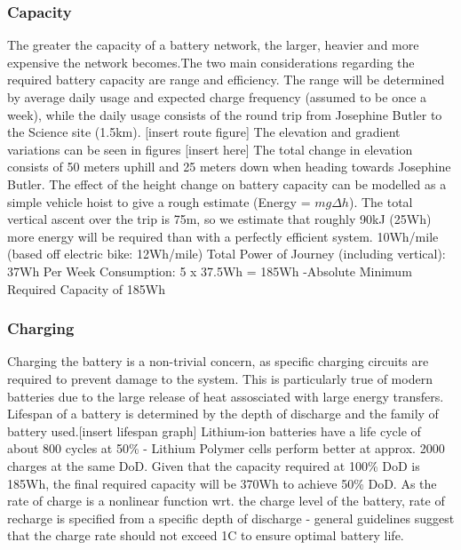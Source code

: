 \documentclass[journal,10pt]{IEEEtran}
\begin{document}
        \subsubsection{Capacity}
        The greater the capacity of a battery network, the larger, heavier and more expensive the network becomes.The two main considerations regarding the required battery capacity are range and efficiency. The range will be determined by average daily usage and expected charge frequency (assumed to be once a week), while the daily usage consists of the round trip from Josephine Butler to the Science site (1.5km). [insert route figure]
        The elevation and gradient variations can be seen in figures [insert here]
        The total change in elevation consists of 50 meters uphill and 25 meters down when heading towards Josephine Butler. The effect of the height change on battery capacity can be modelled as a simple vehicle hoist to give a rough estimate (Energy = $mg\Delta h$). The total vertical ascent over the trip is 75m, so we estimate that roughly 90kJ (25Wh) more energy will be required than with a perfectly efficient system.
            10Wh/mile (based off electric bike: 12Wh/mile)
            Total Power of Journey (including vertical): 37Wh
            Per Week Consumption: 5 x 37.5Wh = 185Wh
            -Absolute Minimum Required Capacity of 185Wh
        \subsubsection{Charging}
            Charging the battery is a non-trivial concern, as specific charging circuits are required to prevent damage to the system. This is particularly true of modern batteries due to the large release of heat assosciated with large energy transfers.
            Lifespan of a battery is determined by the depth of discharge and the family of battery used.[insert lifespan graph]
            Lithium-ion batteries have a life cycle of about 800 cycles at 50\% - Lithium Polymer cells perform better at approx. 2000 charges at the same DoD. Given that the capacity required at 100\% DoD is 185Wh, the final required capacity will be 370Wh to achieve 50\% DoD.
            As the rate of charge is a nonlinear function wrt. the charge level of the battery, rate of recharge is specified from a specific depth of discharge - general guidelines suggest that the charge rate should not exceed 1C to ensure optimal battery life.
\end{document}
